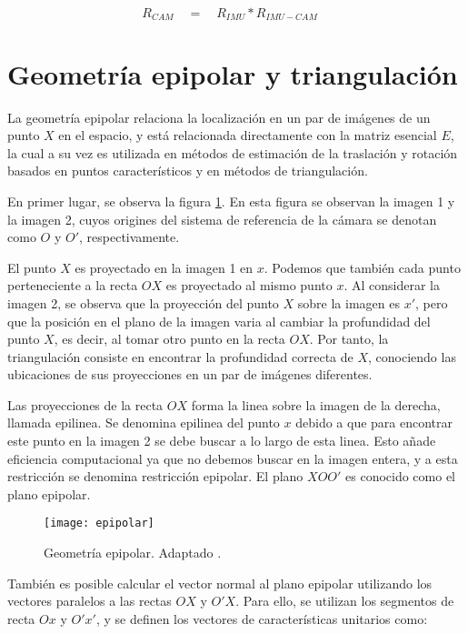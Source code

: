 \begin{equation}
{ R }_{ CAM }\quad =\quad { R }_{ IMU }*{ R }_{ IMU-CAM }\quad 
\label{eq:rotacionIMUCAM} 
\end{equation}


\section{Geometría epipolar y triangulación}

La geometría epipolar relaciona la localización en un par de imágenes de un punto $X$ en el espacio, y está relacionada directamente con la matriz esencial $E$, la cual a su vez es utilizada en métodos de estimación de la traslación y rotación basados en puntos característicos y en métodos de triangulación.

En primer lugar, se observa la figura \ref{imagen:epipolar}. En esta figura se observan la imagen 1 y la imagen 2, cuyos origines del sistema de referencia de la cámara se denotan como $O$ y $O'$, respectivamente.

El punto $X$ es proyectado en la imagen 1 en $x$. Podemos que también cada punto perteneciente a la recta $OX$ es proyectado al mismo punto $x$. Al considerar la imagen 2, se observa que la proyección del punto $X$ sobre la imagen es $x'$, pero que la posición en el plano de la imagen varia al cambiar la profundidad del punto $X$, es decir, al tomar otro punto en la recta $OX$.  Por tanto, la triangulación consiste en encontrar la profundidad correcta de $X$, conociendo las ubicaciones de sus proyecciones en un par de imágenes diferentes.

Las proyecciones de la recta $OX$ forma la linea sobre la imagen de la derecha, llamada epilinea. Se denomina epilinea del punto $x$ debido a que para encontrar este punto en la imagen 2 se debe buscar a lo largo de esta linea. Esto añade eficiencia computacional ya que no debemos buscar en la imagen entera, y a esta restricción se denomina restricción epipolar. El plano $XOO'$ es conocido como el plano epipolar.

\begin{figure}[H]
	\centering
	\texttt{[image: epipolar]}
	\caption[Geometría epipolar]{Geometría epipolar. Adaptado \protect\footnotemark.}
	\label{imagen:epipolar}
\end{figure}

También es posible calcular el vector normal al plano epipolar utilizando los vectores paralelos a las rectas $OX$ y $O'X$. Para ello, se utilizan los segmentos de recta $Ox$ y $O'x'$, y se definen los vectores de características unitarios como:

